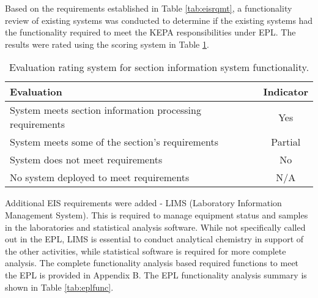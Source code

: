 Based on the requirements established in Table \ref{tab:eisrqmt}, a functionality review of existing systems was conducted to determine if the existing systems had the functionality required to meet the KEPA responsibilities under EPL. The results were rated using the scoring system in Table \ref{tab:funcclass}.

\begin{table}[H]
\centering
\caption{Evaluation rating system for section information system functionality.}
\label{tab:funcclass}
\begin{tabular}{@{}lc@{}}
\toprule
\textbf{Evaluation} & \textbf{Indicator} \\ \midrule
System meets section information processing requirements & Yes \\
System meets some of the section's requirements & Partial \\
System does not meet requirements & No \\
No system deployed to meet requirements & N/A \\ \bottomrule
\end{tabular}
\end{table} 

Additional EIS requirements were added - LIMS (Laboratory Information Management System). This is required to manage equipment status and samples in the laboratories and statistical analysis software. While not specifically called out in the EPL, LIMS is essential to conduct analytical chemistry in support of the other activities, while statistical software is required for more complete analysis. The complete functionality analysis based required functions to meet the EPL is provided in Appendix B. The EPL functionality analysis summary is shown in Table \ref{tab:eplfunc}. 

